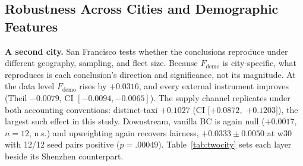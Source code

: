 \subsection{Robustness Across Cities and Demographic Features}
\label{sec:exp-robustness}\label{sec:exp-sf}

\textbf{A second city.} San Francisco tests whether the conclusions reproduce
under different geography, sampling, and fleet size. Because
$F_{\mathrm{demo}}$ is city-specific, what reproduces is each conclusion's
direction and significance, not its magnitude. At the data level
$F_{\mathrm{demo}}$ rises by $+0.0316$, and every external
instrument improves (Theil $-0.0079$, CI $[-0.0094, -0.0065]$). The supply
channel replicates under both accounting conventions: distinct-taxi $+0.1027$
(CI $[+0.0872,$ $+0.1203]$), the largest such effect in this study. Downstream,
vanilla BC is again null ($+0.0017$, $n = 12$, n.s.) and upweighting again
recovers fairness, $+0.0333 \pm 0.0050$ at w30 with 12/12 seed pairs positive
($p = .00049$). Table~\ref{tab:twocity} sets each layer beside its Shenzhen
counterpart.

